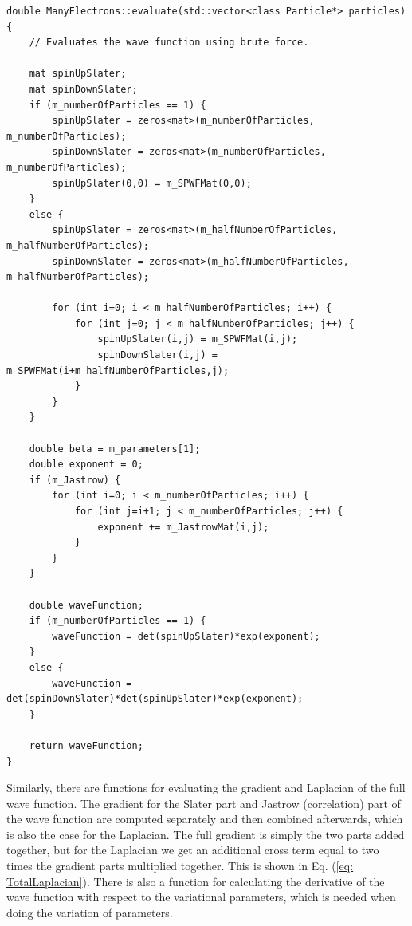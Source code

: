 \documentclass[../main.tex]{subfiles}
\begin{document}
\lstset{language=c++}
\begin{lstlisting}
double ManyElectrons::evaluate(std::vector<class Particle*> particles) {
    // Evaluates the wave function using brute force.

    mat spinUpSlater;
    mat spinDownSlater;
    if (m_numberOfParticles == 1) {
        spinUpSlater = zeros<mat>(m_numberOfParticles, m_numberOfParticles);
        spinDownSlater = zeros<mat>(m_numberOfParticles, m_numberOfParticles);
        spinUpSlater(0,0) = m_SPWFMat(0,0);
    }
    else {
        spinUpSlater = zeros<mat>(m_halfNumberOfParticles, m_halfNumberOfParticles);
        spinDownSlater = zeros<mat>(m_halfNumberOfParticles, m_halfNumberOfParticles);

        for (int i=0; i < m_halfNumberOfParticles; i++) {
            for (int j=0; j < m_halfNumberOfParticles; j++) {
                spinUpSlater(i,j) = m_SPWFMat(i,j);
                spinDownSlater(i,j) = m_SPWFMat(i+m_halfNumberOfParticles,j);
            }
        }
    }

    double beta = m_parameters[1];
    double exponent = 0;
    if (m_Jastrow) {
        for (int i=0; i < m_numberOfParticles; i++) {
            for (int j=i+1; j < m_numberOfParticles; j++) {
                exponent += m_JastrowMat(i,j);
            }
        }
    }

    double waveFunction;
    if (m_numberOfParticles == 1) {
        waveFunction = det(spinUpSlater)*exp(exponent);
    }
    else {
        waveFunction = det(spinDownSlater)*det(spinUpSlater)*exp(exponent);
    }

    return waveFunction;
}
\end{lstlisting}
Similarly, there are functions for evaluating the gradient and Laplacian of the full wave function. The gradient  for the Slater part and Jastrow (correlation) part of the wave function are computed separately and then combined afterwards, which is also the case for the Laplacian. The full gradient is simply the two parts added together, but for the Laplacian we get an additional cross term equal to two times the gradient parts multiplied together. This is shown in Eq. (\ref{eq: TotalLaplacian}). There is also a function for calculating the derivative of the wave function with respect to the variational parameters, which is needed when doing the variation of parameters.
\end{document}
